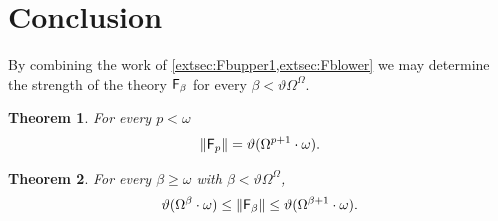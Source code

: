 \documentclass[UKenglish,cleveref,DIV=12]{scrartcl}
\newtheorem{theorem}{Theorem}
\newtheorem{corollary}[lemma]{Corollary}
\theoremstyle{definition}
\theoremstyle{definition}
\begin{document}

\section{Conclusion}\label{extsec:conc}
By combining the work of \cref{extsec:Fbupper1,extsec:Fblower} we may determine
the strength of the theory $\mathsf{F}_\beta$ for every $\beta<\vartheta\Omega^\Omega$.
\begin{theorem}\label{extthm:Fpstrength}
 For every $p<\omega$
 \begin{align*}
  \lVert{\mathsf{F}_p}\rVert=\vartheta(\Omega^{p+1}\cdot\omega).
 \end{align*}
\end{theorem}
\begin{theorem}\label{extthm:Fbetastrength}
 For every $\beta\ge\omega$ with $\beta<\vartheta\Omega^\Omega$,
 \begin{align*}
  \vartheta(\Omega^\beta\cdot\omega)\le\lVert{\mathsf{F}_\beta}\rVert\le\vartheta(\Omega^{\beta+1}\cdot\omega).
 \end{align*}
\end{theorem}
\end{document}
